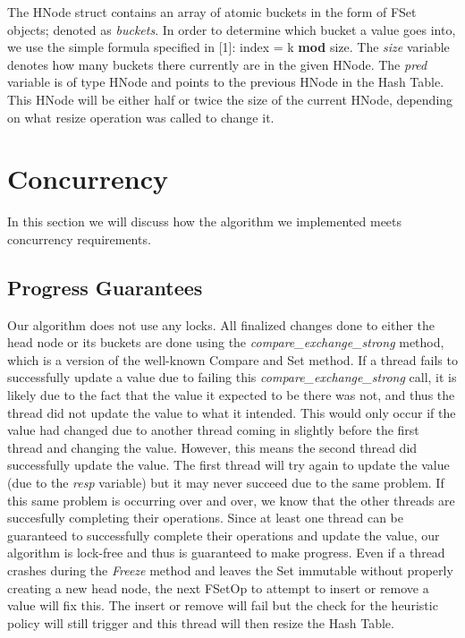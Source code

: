 \documentclass[11pt]{article} %
\begin{document}
The HNode struct contains an array of atomic buckets in the form of FSet objects; denoted as \textit{buckets}. In order to determine which bucket a value goes into, we use the simple formula specified in [1]: index = k \textbf{mod} size. The \textit{size} variable denotes how many buckets there currently are in the given HNode. The \textit{pred} variable is of type HNode and points to the previous HNode in the Hash Table. This HNode will be either half or twice the size of the current HNode, depending on what resize operation was called to change it.

\section{Concurrency}

In this section we will discuss how the algorithm we implemented meets concurrency requirements.

\subsection{Progress Guarantees}

Our algorithm does not use any locks. All finalized changes done to either the head node or its buckets are done using the \textit{compare\_exchange\_strong} method, which is a version of the well-known Compare and Set method. If a thread fails to successfully update a value due to failing this \textit{compare\_exchange\_strong} call, it is likely due to the fact that the value it expected to be there was not, and thus the thread did not update the value to what it intended. This would only occur if the value had changed due to another thread coming in slightly before the first thread and changing the value. However, this means the second thread did successfully update the value. The first thread will try again to update the value (due to the \textit{resp} variable) but it may never succeed due to the same problem. If this same problem is occurring over and over, we know that the other threads are succesfully completing their operations. Since at least one thread can be guaranteed to successfully complete their operations and update the value, our algorithm is lock-free and thus is guaranteed to make progress. Even if a thread crashes during the \textit{Freeze} method and leaves the Set immutable without properly creating a new head node, the next FSetOp to attempt to insert or remove a value will fix this. The insert or remove will fail but the check for the heuristic policy will still trigger and this thread will then resize the Hash Table.
\end{document}
